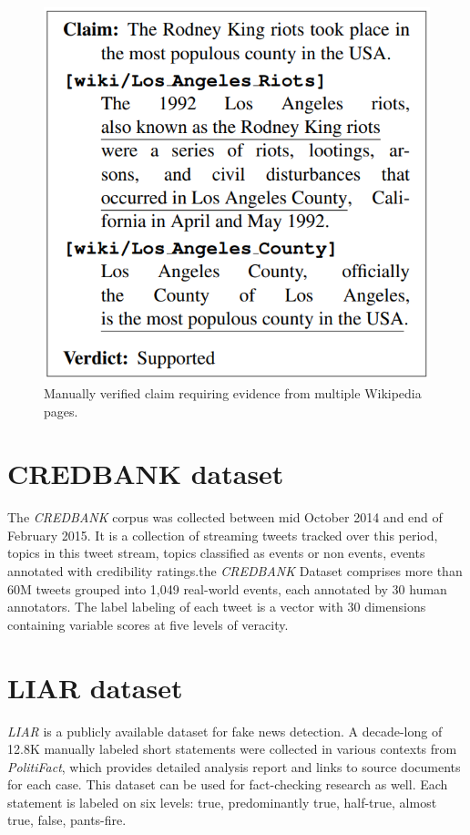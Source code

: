\documentclass[10pt, english]{report}
\begin{document}
\begin{figure}[H]
	\centering
	\includegraphics[scale=0.4]{img/fever_example.png}
	\caption{Manually verified claim requiring evidence from multiple Wikipedia pages.}
\end{figure}

\section{CREDBANK dataset \cite{mitra2015credbank}}
The \textit{CREDBANK} corpus was collected between mid October 2014 and end of February 2015. It is a collection of streaming tweets tracked over this period, topics in this tweet stream, topics classified as events or non events, events annotated with credibility ratings.the \textit{CREDBANK} Dataset comprises more than 60M tweets grouped into 1,049 real-world events, each annotated by 30 human annotators. The label labeling of each tweet is a vector with 30 dimensions containing variable scores at five levels of veracity.

\section{LIAR dataset \cite{wang2017liar}}
\textit{LIAR} is a publicly available dataset for fake news detection. A decade-long of 12.8K manually labeled short statements were collected in various contexts from \textit{PolitiFact}, which provides detailed analysis report and links to source documents for each case. This dataset can be used for fact-checking research as well. Each statement is labeled on six levels: true, predominantly true, half-true, almost true, false, pants-fire.
\end{document}
